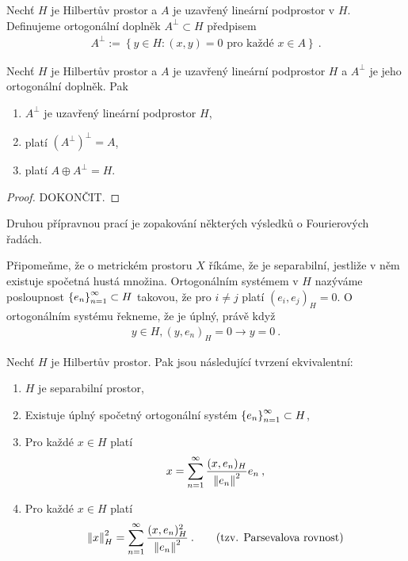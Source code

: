 \begin{definition}
Nechť $H$ je Hilbertův prostor a $A$ je uzavřený lineární podprostor v $H$. Definujeme ortogonální doplněk $A^\bot \subset H$ předpisem \begin{align*}
    A^\bot := \left \lbrace y \in H: (x,y)=0 \text{ pro každé } x \in A  \right \rbrace \:.
\end{align*}
\end{definition}

\begin{theorem}
Nechť $H$ je Hilbertův prostor a $A$ je uzavřený lineární podprostor $H$ a $A^\bot$ je jeho ortogonální doplněk. Pak \begin{enumerate}
    \item $A^\bot$ je uzavřený lineární podprostor $H$,
    \item platí $ (A^\bot)^\bot = A$,
    \item platí $A \oplus A^\bot = H$.
\end{enumerate}
\end{theorem}
\begin{proof}
DOKONČIT.
\end{proof}

Druhou přípravnou prací je zopakování některých výsledků o Fourierových řadách.

Připomeňme, že o metrickém prostoru $X$ říkáme, že je separabilní, jestliže v něm existuje spočetná hustá množina. Ortogonálním systémem v $H$ nazýváme posloupnost $\left \lbrace e_n \right \rbrace_{n=1}^\infty \subset H$ takovou, že pro $i\neq j$ platí $(e_i,e_j)_H =0$. O ortogonálním systému řekneme, že je úplný, právě když \begin{align*}
    y \in H, (y,e_n)_H =0 \rightarrow y = 0 \:.
\end{align*}

\begin{theorem}
Nechť $H$ je Hilbertův prostor. Pak jsou následující tvrzení ekvivalentní: \begin{enumerate}
    \item $H$ je separabilní prostor,
    \item Existuje úplný spočetný ortogonální systém $\left \lbrace e_n \right \rbrace_{n=1}^\infty \subset H$,
    \item Pro každé $x \in H$ platí \begin{align*}
        x = \sum_{n=1}^\infty \dfrac{(x,e_n)_H}{\left\lVert e_n\right\rVert^2} e_n \:,
    \end{align*}
    \item Pro každé $x \in H$ platí \begin{align*}
        \left\lVert x\right\rVert_H^2 = \sum_{n=1}^\infty \dfrac{(x,e_n)^2_H}{\left\lVert e_n\right\rVert^2} \:. \qquad \text{(tzv. Parsevalova rovnost)}
    \end{align*}
\end{enumerate}
\end{theorem}

